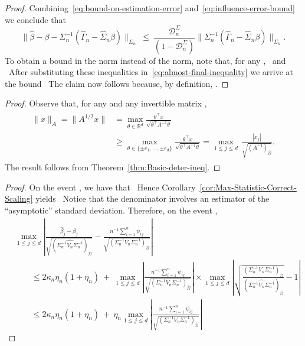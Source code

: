 \documentclass{article}
\begin{document}
\begin{appendices}
\begin{proof}
Combining~\eqref{eq:bound-on-estimation-error} and~\eqref{eq:influence-error-bound} we conclude that
\begin{equation}\label{eq:almost-final-inequality}
\|\widehat{\beta} - \beta - \Sigma_n^{-1}(\widehat{\Gamma}_n - \widehat{\Sigma}_n\beta)\|_{\Sigma_n} ~\le~ \frac{\mathcal{D}_n^{\Sigma}}{(1 - \mathcal{D}_n^{\Sigma})}\|\Sigma_n^{-1}(\widehat{\Gamma}_n - \widehat{\Sigma}_n\beta)\|_{\Sigma_n}.
\end{equation}
To obtain a bound in the   norm instead of the   norm, note that, for any  ,
\ and
\ After substituting these inequalities in~\eqref{eq:almost-final-inequality} we arrive at the bound
\ The claim now follows because, by definition,
 .
\end{proof}
\begin{proof}
Observe that, for any   and any invertible matrix  ,
\begin{align}\label{eq:Scaled-Euclidean-Maximum-Comparison}
\begin{split}
\|x\|_A = \|A^{1/2}x\| &= \max_{\theta\in\mathbb{R}^{d}}\frac{\theta^{\top}x}{\sqrt{\theta^{\top}A^{-1}\theta}}\\ &\geq \max_{\theta \in \{ \pm e_1,\ldots,\pm e_d \}} \frac{\theta^{\top}x}{\sqrt{\theta^{\top}A^{-1}\theta}} = \max_{1\le j\le d}\,\frac{|x_j|}{\sqrt{(A^{-1})_{jj}}}.
\end{split}
\end{align}
The result follows from Theorem~\ref{thm:Basic-deter-ineq}.
\end{proof}
\begin{proof}
On the event  , we have that
\ Hence Corollary~\ref{cor:Max-Statistic-Correct-Scaling} yields
\ Notice that the denominator involves an estimator of the ``asymptotic'' standard deviation. Therefore, on the event  ,
\begin{align*}
&\max_{1\le j\le d}\left|\frac{\widehat{\beta}_j - \beta_j}{\sqrt{(\widehat{\Sigma_n^{-1}V_n\Sigma_n^{-1}})_{jj}}} - \frac{n^{-1}\sum_{i=1}^n \psi_{ij}}{\sqrt{(\Sigma_n^{-1}V_n\Sigma_n^{-1})_{jj}}}\right|\\ &\qquad\le 2\kappa_n\eta_n(1 + \eta_n) ~+~ \max_{1\le j\le d}\left|\frac{n^{-1}\sum_{i=1}^n \psi_{ij}}{\sqrt{(\Sigma_n^{-1}V_n\Sigma_n^{-1})_{jj}}}\right|\times\max_{1\le j\le d}\left|\sqrt{\frac{(\Sigma_n^{-1}V_n\Sigma_n^{-1})_{jj}}{(\widehat{\Sigma_n^{-1}V_n\Sigma_n^{-1}})_{jj}}} - 1\right|\\ &\qquad\le 2\kappa_n\eta_n(1 + \eta_n) ~+~ \eta_n\max_{1\le j\le d}\left|\frac{n^{-1}\sum_{i=1}^n \psi_{ij}}{\sqrt{(\Sigma_n^{-1}V_n\Sigma_n^{-1})_{jj}}}\right|

\end{align*}
\end{proof}
\end{appendices}
\end{document}
